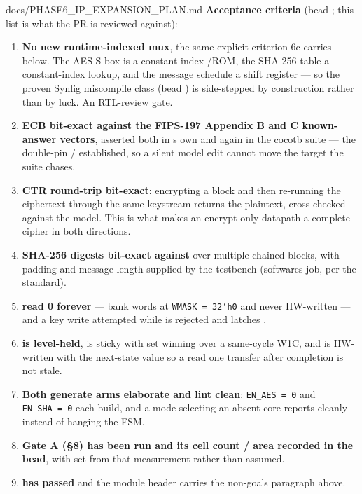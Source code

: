 \begin{relocated}{docs/PHASE6_IP_EXPANSION_PLAN.md}
\textbf{Acceptance criteria} (bead ; this list is what the
PR is reviewed against):

\begin{enumerate}
\def\labelenumi{\arabic{enumi}.}
\tightlist
\item
  \textbf{No new runtime-indexed mux}, the same explicit criterion 6c
  carries below. The AES S-box is a constant-index /ROM, the
  SHA-256  table a constant-index lookup, and the message
  schedule a shift register --- so the proven Synlig 
  miscompile class (bead ) is side-stepped by construction
  rather than by luck. An RTL-review gate.
\item
  \textbf{ECB bit-exact against the FIPS-197 Appendix B and C
  known-answer vectors}, asserted both in
  \textquotesingle s own
   and again in the cocotb suite --- the double-pin
   / 
  established, so a silent model edit cannot move the target the suite
  chases.
\item
  \textbf{CTR round-trip bit-exact}: encrypting a block and then
  re-running the ciphertext through the same keystream returns the
  plaintext, cross-checked against the model. This is what makes an
  encrypt-only datapath a complete cipher in both directions.
\item
  \textbf{SHA-256 digests bit-exact against } over
  multiple chained blocks, with padding and message length supplied by
  the testbench (software\textquotesingle s job, per the standard).
\item
  \textbf{ read 0 forever} --- bank words at
  \texttt{WMASK\ =\allowbreak{}\ 32'h0} and never HW-written --- and a
  key write attempted while  is rejected and latches
  .
\item
  \textbf{ is level-held},  is sticky
  with set winning over a same-cycle  W1C, and
   is HW-written with the next-state value so a read one
  transfer after completion is not stale.
\item
  \textbf{Both generate arms elaborate and lint clean}:
  \texttt{EN\_\allowbreak{}AES\ =\allowbreak{}\ 0} and
  \texttt{EN\_\allowbreak{}SHA\ =\allowbreak{}\ 0} each build, and a
  mode selecting an absent core reports cleanly instead of hanging the
  FSM.
\item
  \textbf{Gate A (§8) has been run and its cell count / area recorded in
  the bead}, with  set from that measurement rather
  than assumed.
\item
  \textbf{ has passed} and the module header
  carries the non-goals paragraph above.
\end{enumerate}


\end{relocated}
